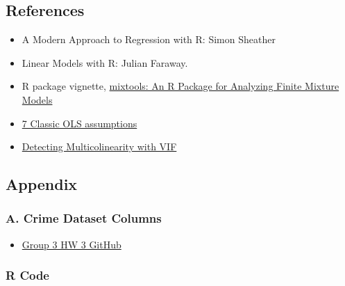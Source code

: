 \documentclass[
]{article}
\providecommand{\tightlist}{%
  \setlength{\itemsep}{0pt}\setlength{\parskip}{0pt}}
\begin{document}
\hypertarget{references}{%
\subsection{References}\label{references}}

\begin{itemize}
\tightlist
\item
  A Modern Approach to Regression with R: Simon Sheather
\item
  Linear Models with R: Julian Faraway.
\item
  R package vignette,
  \href{https://cran.r-project.org/web/packages/mixtools/vignettes/mixtools.pdf}{mixtools:
  An R Package for Analyzing Finite Mixture Models}
\item
  \href{https://statisticsbyjim.com/regression/ols-linear-regression-assumptions/}{7
  Classic OLS assumptions}
\item
  \href{https://online.stat.psu.edu/stat462/node/180/}{Detecting
  Multicolinearity with VIF}
\end{itemize}

\hypertarget{appendix}{%
\subsection{Appendix}\label{appendix}}

\hypertarget{a.-crime-dataset-columns}{%
\subsubsection{A. Crime Dataset
Columns}\label{a.-crime-dataset-columns}}

\begin{itemize}
\tightlist
\item
  \href{https://github.com/djlofland/DS621_F2020_Group3/tree/master/Homework_3}{Group
  3 HW 3 GitHub}
\end{itemize}

\hypertarget{r-code}{%
\subsubsection{R Code}\label{r-code}}
\end{document}
